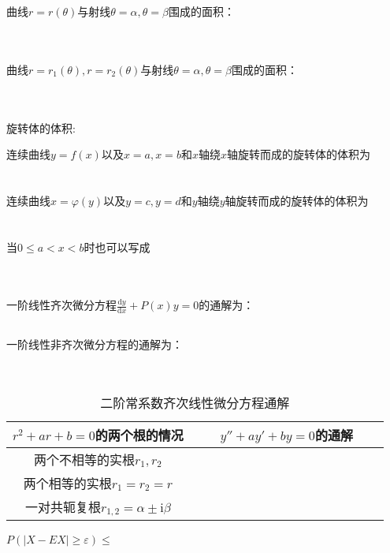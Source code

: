 曲线$r=r(\theta)$与射线$\theta=\alpha,\theta=\beta$围成的面积：
\begin{equation*}
    \phantom{\frac{1}{2}\int_{\alpha}^{\beta} r^2(\theta) \,\mathrm{d}\theta }
\end{equation*}

曲线$r=r_1(\theta),r=r_2(\theta)$与射线$\theta=\alpha,\theta=\beta$围成的面积：
\begin{equation*}
    \phantom{\frac{1}{2}\int_{\alpha}^{\beta} \left\lvert r_1^2(\theta)-r_2^2(\theta)\right\rvert \,\mathrm{d}\theta }
\end{equation*}

旋转体的体积:

连续曲线$y=f(x)$以及$x=a,x=b$和$x$轴绕$x$轴旋转而成的旋转体的体积为
\begin{equation*}
    \phantom{V_x=\pi \int_{a}^{b} f^2(x) \,\mathrm{d}x .}
\end{equation*}
连续曲线$x=\varphi (y)$以及$y=c,y=d$和$y$轴绕$y$轴旋转而成的旋转体的体积为
\begin{equation*}
    \phantom{V_y=\pi \int_{c}^{d} \varphi ^2(y) \,\mathrm{d}y .}
\end{equation*}
当$0\leqslant a<x<b$时也可以写成
\begin{equation*}
    \phantom{V_y=2\pi \int_{a}^{b} x\left\lvert f(x)\right\rvert  \,\mathrm{d}x .}
\end{equation*}

一阶线性齐次微分方程$\frac{\mathrm{d} y}{\mathrm{d} x} + P(x)y = 0 $的通解为：
\begin{equation*}
    \phantom{y=C\cdot \mathrm{e}^{-\int P(x) \,\mathrm{d}x }.}
\end{equation*}

一阶线性非齐次微分方程的通解为：
\begin{equation*}
    \phantom{y=\mathrm{e}^{-\int P(x) \,\mathrm{d}x }\left( \int Q(x)\mathrm{e}^{\int P(x) \,\mathrm{d}x } \,\mathrm{d}x +C \right).}
\end{equation*}

\begin{table}[]
    \caption{二阶常系数齐次线性微分方程通解}
    \label{qicifc}
    \centering
    \begin{tabular}{@{}cc@{}}
    \toprule
    $r^2+ar+b=0$的两个根的情况         & $y''+ay'+by=0$的通解                                 \\ \midrule
    两个不相等的实根$r_1,r_2$           & $\phantom{y=C_1e^{r_1x}+C_2e^{r_2x}}$                       \\
    两个相等的实根$r_1=r_2=r$          & $\phantom{y=(C_1+C_2x)e^{rx}}$                              \\
    一对共轭复根$r_{1,2}=\alpha\pm \mathrm{i}\beta$ & $\phantom{y=e^{\alpha x}(C_1\cos \beta x+C_2\sin \beta x)}$ \\ \bottomrule
    \end{tabular}
\end{table}

$P(\left\lvert X-EX \right\rvert \geqslant \varepsilon )\leqslant \phantom{\frac{DX}{\varepsilon ^2}}$